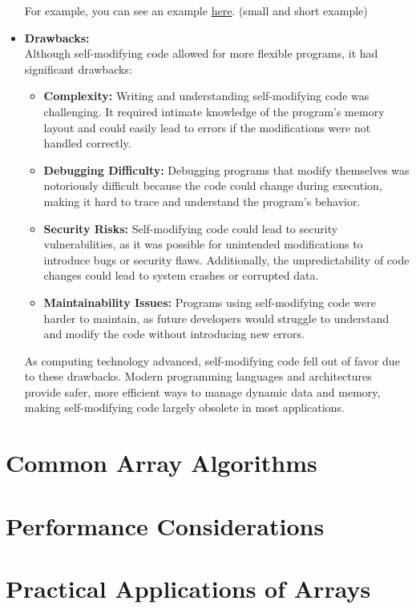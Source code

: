 \documentclass[12pt, oneside]{book}
\begin{document}
\begin{itemize}
		For example, you can see an example \href{https://github.com/m-mdy-m/Arliz/blob/main/Self-Modifying-Code/index.asm}{here}. (small and short example)
		
		\item \textbf{Drawbacks:} \\
		Although self-modifying code allowed for more flexible programs, it had significant drawbacks:
		\begin{itemize}
			\item \textbf{Complexity:} Writing and understanding self-modifying code was challenging. It required intimate knowledge of the program's memory layout and could easily lead to errors if the modifications were not handled correctly.
			\item \textbf{Debugging Difficulty:} Debugging programs that modify themselves was notoriously difficult because the code could change during execution, making it hard to trace and understand the program's behavior.
			\item \textbf{Security Risks:} Self-modifying code could lead to security vulnerabilities, as it was possible for unintended modifications to introduce bugs or security flaws. Additionally, the unpredictability of code changes could lead to system crashes or corrupted data.
			\item \textbf{Maintainability Issues:} Programs using self-modifying code were harder to maintain, as future developers would struggle to understand and modify the code without introducing new errors.
		\end{itemize}
		
		As computing technology advanced, self-modifying code fell out of favor due to these drawbacks. Modern programming languages and architectures provide safer, more efficient ways to manage dynamic data and memory, making self-modifying code largely obsolete in most applications.
	\end{itemize}

\section{Common Array Algorithms}
\section{Performance Considerations}
\section{Practical Applications of Arrays}
\end{document}
